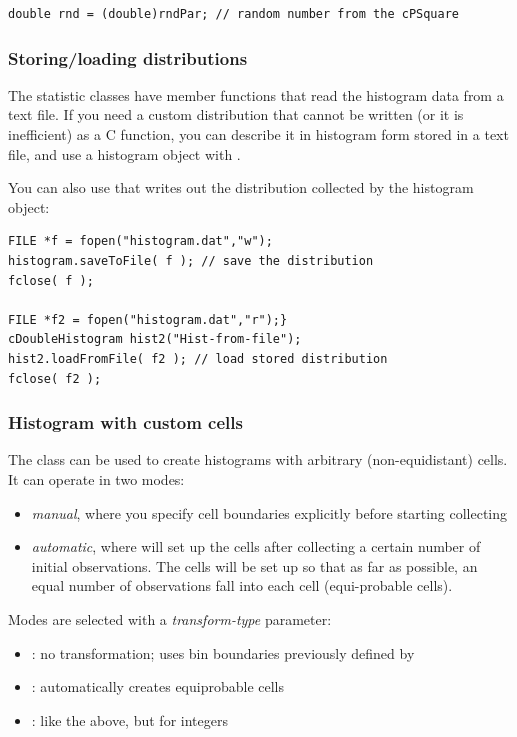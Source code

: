 \begin{verbatim}
double rnd = (double)rndPar; // random number from the cPSquare
\end{verbatim}

\subsubsection{Storing/loading distributions}


The statistic classes have  member functions
that read the histogram data from a text file. If you need a custom
distribution that cannot be written (or it
is inefficient) as a C function, you can describe it in histogram form
stored in a text file, and use a histogram object with
.

You can also use that writes out the distribution
collected by the histogram object:

\begin{verbatim}
FILE *f = fopen("histogram.dat","w");
histogram.saveToFile( f ); // save the distribution
fclose( f );

FILE *f2 = fopen("histogram.dat","r");}
cDoubleHistogram hist2("Hist-from-file");
hist2.loadFromFile( f2 ); // load stored distribution
fclose( f2 );
\end{verbatim}


\subsubsection{Histogram with custom cells}


The  class can be used to create
histograms with arbitrary (non-equidistant) cells.
It can operate in two modes:

\begin{itemize}
  \item \textit{manual}, where you specify cell boundaries explicitly
     before starting collecting
  \item \textit{automatic}, where  will set up the cells
     after collecting a certain number of initial observations. The cells
     will be set up so that as far as possible, an equal number of observations
     fall into each cell (equi-probable cells).
\end{itemize}

Modes are selected with a \textit{transform-type} parameter:
\begin{itemize}
  \item{: no transformation; uses bin boundaries
    previously defined by }
  \item{: automatically creates equiprobable cells}
  \item{: like the above, but for integers}
\end{itemize}

